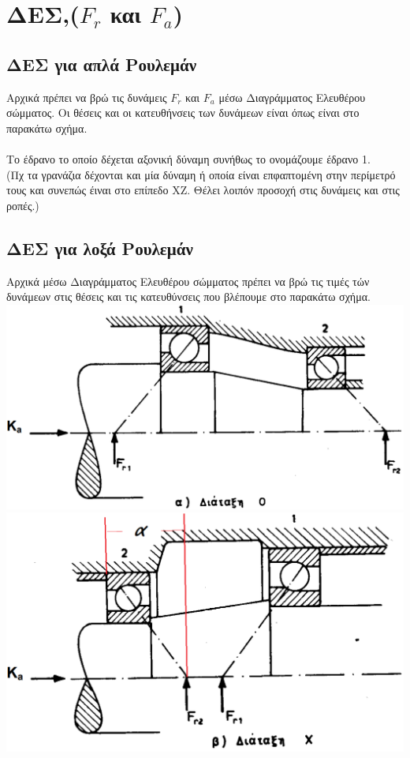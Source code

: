 \documentclass{article}
\begin{document}
\section{ΔΕΣ,($F_r$ και $F_a$)}

\subsection{ΔΕΣ για απλά Ρουλεμάν}
Αρχικά πρέπει να βρώ τις δυνάμεις $F_r$ και $F_a$ μέσω Διαγράμματος Ελευθέρου σώμματος. Οι θέσεις και οι κατευθήνσεις των δυνάμεων είναι όπως είναι στο παρακάτω σχήμα.
\\
\\
Το έδρανο το οποίο δέχεται αξονική δύναμη συνήθως το ονομάζουμε έδρανο 1.
\\
(Πχ τα γρανάζια δέχονται και μία δύναμη ή οποία είναι επφαπτομένη στην περίμετρό τους και συνεπώς έιναι στο επίπεδο ΧΖ. Θέλει λοιπόν προσοχή στις δυνάμεις και στις ροπές.)


\subsection{ΔΕΣ για λοξά Ρουλεμάν}
Αρχικά μέσω Διαγράμματος Ελευθέρου σώμματος πρέπει να βρώ τις τιμές τών δυνάμεων στις θέσεις και τις κατευθύνσεις που βλέπουμε στο παρακάτω σχήμα.
\\
\includegraphics[width=0.5\linewidth]{3.png}
\includegraphics[width=0.5\linewidth]{3.1.png}
\\
\end{document}
